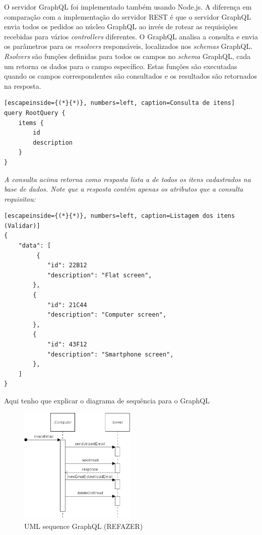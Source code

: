 O servidor GraphQL foi implementado também usando Node.js. A diferença em comparação com a implementação do servidor REST é que o servidor GraphQL envia todos os pedidos ao núcleo GraphQL ao invés de rotear as requisições recebidas para vários \textit{controllers} diferentes. O GraphQL analisa a consulta e envia os parâmetros para os \textit{resolvers} responsáveis, localizados nos \textit{schemas} GraphQL. \textit{Rsolvers} são funções definidas para todos os campos no \textit{schema} GraphQL, cada um retorna os dados para o campo específico. Estas funções são executadas quando os campos correspondentes são consultados e os resultados são retornados na resposta.

\begin{lstlisting}[escapeinside={(*}{*)}, numbers=left, caption=Consulta de itens]
query RootQuery {
	items {
    	id
    	description
    }
}

\end{lstlisting}

 \textit{ A consulta acima retorna como resposta lista a de todos os itens cadastrados na base de dados. Note que a resposta contém apenas os atributos que a consulta requisitou: }

\begin{lstlisting}[escapeinside={(*}{*)}, numbers=left, caption=Listagem dos itens (Validar)]
{
    "data": [
         {
        	"id": 22B12
            "description": "Flat screen",
        },
        {
        	"id": 21C44
            "description": "Computer screen",
        },
        {
        	"id": 43F12
            "description": "Smartphone screen",
        },
    ]
}

\end{lstlisting}

Aqui tenho que explicar o diagrama de sequência para o GraphQL

\begin{figure}[htbp]
\centering
\includegraphics[width=0.5\textwidth]{figuras/uml-sequence.png}
\caption{UML sequence GraphQL (REFAZER)}
\label{fig:graph-uml}
\author{fonte: Autor}
\end{figure}

